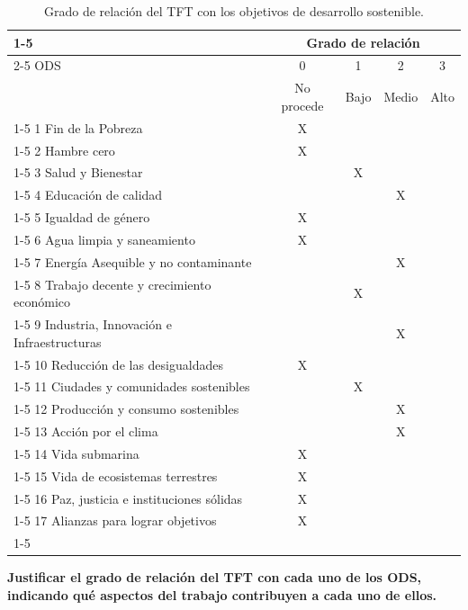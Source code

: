 \documentclass[oneside,12pt]{book}
\begin{document}
\begin{center}

\begin{table}[!htbp]
\caption{Grado de relación del TFT con los objetivos de desarrollo sostenible.}
\label{tab:ODS}
\centering
\begin{tabular}{|l|c|c|c|c|}
\cline{1-5}
  & \multicolumn{4}{c|}{Grado de relación} \\ \cline{2-5} 
 ODS & 0 & 1 & 2 & 3 \\
  & No procede & Bajo & Medio & Alto \\  
  \cline{1-5} 
1 Fin de la Pobreza & X & & & \\ \cline{1-5}
2 Hambre cero & X & & & \\ \cline{1-5}
3 Salud y Bienestar & & X & & \\ \cline{1-5}
4 Educación de calidad & & & X & \\ \cline{1-5}
5 Igualdad de género & X & & & \\ \cline{1-5}
6 Agua limpia y saneamiento & X & & & \\ \cline{1-5}
7 Energía Asequible y no contaminante & & & X & \\ \cline{1-5}
8 Trabajo decente y crecimiento económico & & X & & \\ \cline{1-5}
9 Industria, Innovación e Infraestructuras & & & X & \\ \cline{1-5}
10 Reducción de las desigualdades & X & & & \\ \cline{1-5}
11 Ciudades y comunidades sostenibles & & X & & \\ \cline{1-5}
12 Producción y consumo sostenibles & & & X & \\ \cline{1-5} 
13 Acción por el clima & & & X & \\ \cline{1-5}
14 Vida submarina & X & & & \\ \cline{1-5}
15 Vida de ecosistemas terrestres & X & & & \\ \cline{1-5}
16 Paz, justicia e instituciones sólidas & X & & & \\ \cline{1-5}
17 Alianzas para lograr objetivos & X & & & \\ \cline{1-5}
\end{tabular}%
\end{table}
\end{center}
\textbf{Justificar el grado de relación del TFT con cada uno de los ODS, indicando qué aspectos del trabajo contribuyen a cada uno de ellos.}
\\%
\end{document}
